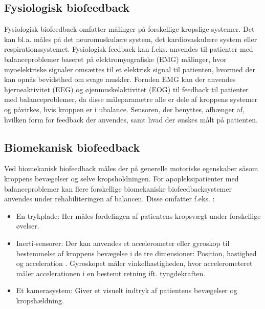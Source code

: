 \subsection{Fysiologisk biofeedback}
Fysiologisk biofeedback omfatter målinger på forskellige kropslige systemer. Det kan bl.a. måles på det neuromuskulære system, det kardiovaskulære system eller respirationssystemet. Fysiologisk feedback kan f.eks. anvendes til patienter med balanceproblemer baseret på elektromyografiske (EMG) målinger, hvor myoelektriske signaler omsættes til et elektrisk signal til patienten,  hvormed der kan opnås bevidsthed om svage muskler. Foruden EMG kan der anvendes hjerneaktivitet (EEG) og øjenmuskelaktivitet (EOG) til feedback til patienter med balanceproblemer, da disse måleparametre alle er dele af kroppens systemer og påvirkes, hvis kroppen er i ubalance. Sensoren, der benyttes, afhænger af, hvilken form for feedback der anvendes, samt hvad der ønskes målt på patienten. \cite{Prentice2007}


\subsection{Biomekanisk biofeedback}\label{MekBioFeed}
Ved biomekanisk biofeedback måles der på generelle motoriske egenskaber såsom kroppens bevægelser og selve kropsholdningen. For apopleksipatienter med balanceproblemer kan flere forskellige biomekaniske biofeedbacksystemer anvendes under rehabiliteringen af balancen. Disse omfatter f.eks. \cite{Giggins2013}:
\begin{itemize}
\item En trykplade: Her måles fordelingen af patientens kropsvægt under forskellige øvelser. 
\item Inerti-sensorer: Der kan anvendes et accelerometer eller gyroskop til bestemmelse af kroppens bevægelse i de tre dimensioner: Position, hastighed og acceleration . Gyroskopet måler vinkelhastigheden, hvor accelerometeret måler accelerationen i en bestemt retning ift. tyngdekraften.
\item Et kamerasystem: Giver et visuelt indtryk af patientens bevægelser og kropshældning. 
\end{itemize}

